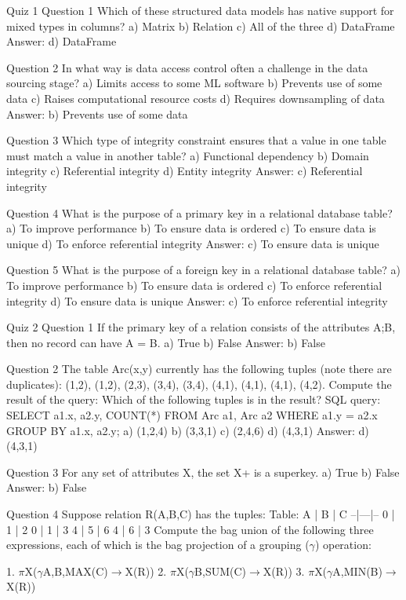 Quiz 1
  Question 1
  Which of these structured data models has native support for mixed types in columns?
  a) Matrix
  b) Relation
  c) All of the three
  d) DataFrame
  Answer: d) DataFrame

  Question 2
  In what way is data access control often a challenge in the data sourcing stage?
  a) Limits access to some ML software
  b) Prevents use of some data
  c) Raises computational resource costs
  d) Requires downsampling of data
  Answer: b) Prevents use of some data
  
  Question 3
  Which type of integrity constraint ensures that a value in one table must match a value in another table?
  a) Functional dependency
  b) Domain integrity
  c) Referential integrity
  d) Entity integrity
  Answer: c) Referential integrity
  
  Question 4
  What is the purpose of a primary key in a relational database table?
  a) To improve performance
  b) To ensure data is ordered
  c) To ensure data is unique
  d) To enforce referential integrity
  Answer: c) To ensure data is unique
  
  Question 5
  What is the purpose of a foreign key in a relational database table?
  a) To improve performance
  b) To ensure data is ordered
  c) To enforce referential integrity
  d) To ensure data is unique
  Answer: c) To enforce referential integrity

Quiz 2
  Question 1
  If the primary key of a relation consists of the attributes A;B, then no record can have A = B.
  a) True
  b) False
  Answer: b) False

  Question 2
  The table Arc(x,y) currently has the following tuples (note there are duplicates): (1,2), (1,2), (2,3), (3,4), (3,4), (4,1), (4,1), (4,1), (4,2). Compute the result of the query: Which of the following tuples is in the result?
    SQL query:
    SELECT a1.x, a2.y, COUNT(*)
    FROM Arc a1, Arc a2
    WHERE a1.y = a2.x
    GROUP BY a1.x, a2.y;
  a) (1,2,4)
  b) (3,3,1)
  c) (2,4,6)
  d) (4,3,1)
  Answer: d) (4,3,1)

  Question 3
  For any set of attributes X, the set X+ is a superkey.
  a) True
  b) False
  Answer: b) False

  Question 4
  Suppose relation R(A,B,C) has the tuples:
    Table:
    A | B | C
    --|---|--
    0 | 1 | 2
    0 | 1 | 3
    4 | 5 | 6
    4 | 6 | 3
  Compute the bag union of the following three expressions, each of which is the bag projection of a grouping ($\gamma$) operation:

  1. $\pi$X($\gamma$A,B,MAX(C)$\rightarrow$X(R))
  2. $\pi$X($\gamma$B,SUM(C)$\rightarrow$X(R))
  3. $\pi$X($\gamma$A,MIN(B)$\rightarrow$X(R))

